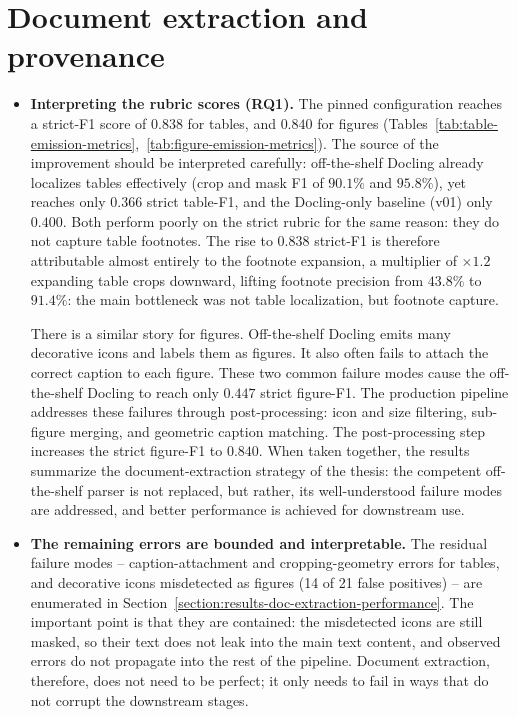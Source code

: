 \section{Document extraction and provenance}\label{section:disc-doc-extraction-and-provenance}

\begin{itemize}[label={},leftmargin=1.5em]

    \item \textbf{Interpreting the rubric scores (RQ1).} The pinned configuration reaches a strict-F1 score of $0.838$ for tables, and $0.840$ for figures (Tables~\ref{tab:table-emission-metrics},~\ref{tab:figure-emission-metrics}). The source of the improvement should be interpreted carefully: off-the-shelf Docling already localizes tables effectively (crop and mask F1 of $90.1\%$ and $95.8\%$), yet reaches only $0.366$ strict table-F1, and the Docling-only baseline (v01) only $0.400$. Both perform poorly on the strict rubric for the same reason: they do not capture table footnotes. The rise to $0.838$ strict-F1 is therefore attributable almost entirely to the footnote expansion, a multiplier of $\times1.2$ expanding table crops downward, lifting footnote precision from $43.8\%$ to $91.4\%$: the main bottleneck was not table localization, but footnote capture.
    
    There is a similar story for figures. Off-the-shelf Docling emits many decorative icons and labels them as figures. It also often fails to attach the correct caption to each figure. These two common failure modes cause the off-the-shelf Docling to reach only $0.447$ strict figure-F1. The production pipeline addresses these failures through post-processing: icon and size filtering, sub-figure merging, and geometric caption matching. The post-processing step increases the strict figure-F1 to $0.840$. When taken together, the results summarize the document-extraction strategy of the thesis: the competent off-the-shelf parser is not replaced, but rather, its well-understood failure modes are addressed, and better performance is achieved for downstream use.

    \item \textbf{The remaining errors are bounded and interpretable.} The residual failure modes -- caption-attachment and cropping-geometry errors for tables, and decorative icons misdetected as figures (14 of 21 false positives) -- are enumerated in Section~\ref{section:results-doc-extraction-performance}. The important point is that they are contained: the misdetected icons are still masked, so their text does not leak into the main text content, and observed errors do not propagate into the rest of the pipeline. Document extraction, therefore, does not need to be perfect; it only needs to fail in ways that do not corrupt the downstream stages.


\end{itemize}
